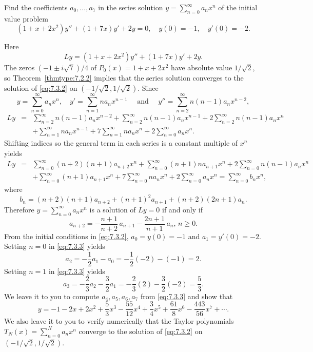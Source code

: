 \documentclass{ximera}
\begin{document}
\begin{example}\label{example:7.3.1}
Find the coefficients $a_0, \dots, a_7$ in the  series solution
$y=\sum^\infty_{n=0}
a_nx^n$  of the initial value problem
\begin{equation} \label{eq:7.3.2}
(1+x+2x^2)y''+(1+7x)y'+2y=0,\quad y(0)=-1,\quad y'(0)=-2.
\end{equation}


\begin{explanation}
Here
$$
Ly=(1+x+2x^2)y''+(1+7x)y'+2y.
$$
The zeros $(-1\pm i\sqrt7)/4$ of $P_0(x)=1+x+2x^2$ have absolute value
$1/\sqrt2$, so Theorem~\ref{thmtype:7.2.2} implies that the series
solution
converges to the solution of \eqref{eq:7.3.2} on $(-1/\sqrt2,1/\sqrt2)$.
Since
$$
y=\sum^\infty_{n=0} a_nx^n,\quad y'=\sum^\infty_{n=1} n
a_nx^{n-1}\quad\mbox{ and }\quad  y''=\sum^\infty_{n=2}n(n-1)a_nx^{n-2},
$$
\begin{eqnarray*}
Ly&=&\sum^\infty_{n=2}n(n-1)a_nx^{n-2}+\sum^\infty_{n=2}n(n-1)a_nx^{n-1}
+2\sum^\infty_{n=2}n(n-1)a_nx^n\\
&&+\sum^\infty_{n=1}na_nx^{n-1}+7\sum^\infty_{n=1}na_nx^n+2\sum^\infty_{n=0}
a_nx^n.
\end{eqnarray*}
Shifting indices so  the general term in each
series is a constant multiple of $x^n$ yields
\begin{eqnarray*}
Ly&=&\sum^\infty_{n=0}(n+2)(n+1)a_{n+2}x^n+\sum^\infty_{n=0}(n+1)na_{n+1}x^n
+2\sum^\infty_{n=0}n(n-1)a_nx^n\\
&&+\sum^\infty_{n=0}(n+1)a_{n+1}x^n+7\sum^\infty_{n=0}na_nx^n+
2\sum^\infty_{n=0}a_nx^n
=\sum^\infty_{n=0}b_nx^n,
\end{eqnarray*}
where
$$
b_n=(n+2)(n+1)a_{n+2}+(n+1)^2a_{n+1}+(n+2)(2n+1)a_n.
$$
Therefore $y=\sum^\infty_{n=0}a_nx^n$ is a solution of $Ly=0$
if and only if
\begin{equation} \label{eq:7.3.3}
a_{n+2}=-\frac{n+1}{n+2}\,a_{n+1}-\frac{2n+1}{n+1}\,a_n,\,n\geq0.
\end{equation}
From the initial conditions in \eqref{eq:7.3.2}, $a_0=y(0)=-1$ and
$a_1=y'(0)=-2$.
Setting $n=0$  in \eqref{eq:7.3.3} yields
$$
a_2=-\frac{1}{2}a_1-a_0=-\frac{1}{2}(-2)-(-1)=2.
$$
Setting $n=1$  in \eqref{eq:7.3.3} yields
$$
a_3=-\frac{2}{3}a_2-\frac{3}{2}a_1=-\frac{2}{3}(2)-\frac{3}{2}(-2)=\frac{5}{3}.
$$
We leave it to you to compute $a_4,a_5,a_6,a_7$ from \eqref{eq:7.3.3} and
show that
$$
y=-1-2x+2x^2+\frac{5}{3}x^3-\frac{55}{12}x^4+\frac{3}{4}x^5+\frac{61}{8}x^6-
\frac{443}{56}x^7+\cdots .
$$
We also leave it to you %
to verify numerically
that the Taylor polynomials $T_N(x)=\sum_{n=0}^Na_nx^n$ converge
to the solution of \eqref{eq:7.3.2}
on $(-1/\sqrt2,1/\sqrt2)$.
\end{explanation}
\end{example}
\end{document}
